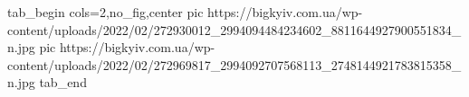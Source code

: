  
 
 
 
 


\ifcmt
  tab_begin cols=2,no_fig,center
     pic https://bigkyiv.com.ua/wp-content/uploads/2022/02/272930012_2994094484234602_8811644927900551834_n.jpg
		 pic https://bigkyiv.com.ua/wp-content/uploads/2022/02/272969817_2994092707568113_2748144921783815358_n.jpg
  tab_end
\fi
